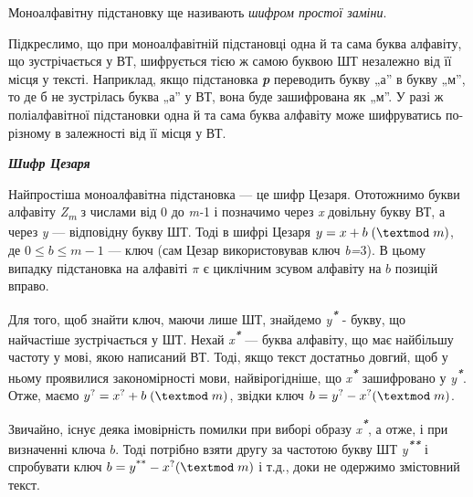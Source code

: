 Моноалфавітну підстановку ще називають \textit{шифром простої заміни}.

Підкреслимо, що при моноалфавітній підстановці одна й та сама буква алфавіту, що
зустрічається у ВТ, шифрується тією ж самою буквою ШТ незалежно від її місця у
тексті. Наприклад, якщо підстановка \textbf{\textit{\textgreek{p}}} переводить
букву „а” в  букву „м”, то де б не зустрілась буква „а” у ВТ, вона буде
зашифрована як „м”. У разі ж поліалфавітної підстановки одна й та сама буква
алфавіту може шифруватись по-різному в залежності від її місця у ВТ.


\bigskip


\bigskip

{\centering\bfseries\itshape
Шифр Цезаря
\par}


\bigskip


\bigskip

Найпростіша моноалфавітна підстановка --- це шифр Цезаря. Ототожнимо букви
алфавіту \textit{Z}\textit{\textsubscript{m}} з числами від\textbf{ }0 до
\textit{m-}1 і позначимо через \textit{x} довільну букву ВТ, а через \textit{y}
--- відповідну букву ШТ. Тоді в шифрі Цезаря   $y=x+b\;(\textmod\;m)$, де 
$0\le b\le m-1$ --- ключ (сам Цезар використовував ключ \textit{b}\textit{=}3).
В цьому випадку підстановка на алфавіті  $\pi $ є циклічним зсувом алфавіту
на  $b$ позицій вправо.

Для того, щоб знайти ключ, маючи лише ШТ, знайдемо
\textit{y}\textbf{\textit{\textsuperscript{*}}} - букву, що найчастіше
зустрічається у ШТ. Нехай \textit{x}\textbf{\textit{\textsuperscript{*}}} ---
буква алфавіту, що має найбільшу частоту у мові, якою написаний ВТ. Тоді, якщо
текст достатньо довгий, щоб у ньому проявилися закономірності мови,
найвірогідніше, що \textit{x}\textbf{\textit{\textsuperscript{*}}} зашифровано
у  \textit{y}\textbf{\textit{\textsuperscript{*}}}. Отже, маємо 
$y^{?}=x^{?}+b\;(\textmod\;m)$, звідки ключ 
$b=y^{?}-x^{?}(\textmod\;m)$.

Звичайно, існує деяка імовірність помилки при виборі образу
\textit{x}\textbf{\textit{\textsuperscript{*}}}, а отже, і при визначенні ключа
 $b$. Тоді потрібно взяти другу за частотою букву ШТ
\textit{y}\textbf{\textit{\textsuperscript{** }}}і спробувати ключ  
$b=y^{\text{**}}-x^{?}(\textmod\;m)$ і т.д., доки не одержимо
змістовний текст.


\bigskip


\bigskip


\bigskip


